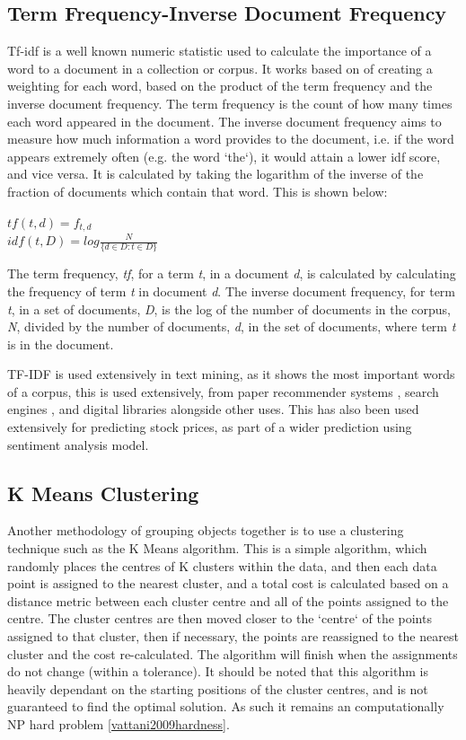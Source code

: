  \subsection{Term Frequency-Inverse Document Frequency}
 Tf-idf is a well known numeric statistic used to calculate the importance of a word to a document in a collection or corpus. It works based on of creating a weighting for each word, based on the product of the term frequency and the inverse document frequency. The term frequency is the count of how many times each word appeared in the document. The inverse document frequency aims to measure how much information a word provides to the document, i.e. if the word appears extremely often (e.g. the word `the`), it would attain a lower idf score, and vice versa. It is calculated by taking the logarithm of the inverse of the fraction of documents which contain that word. This is shown below:
 
 \begin{center}
 	$tf(t,d) = f_{t,d}$\\
 	$idf(t, D) = log\frac{N}{\{d \in D : t \in D\}}$
 \end{center}
 
The term frequency, \textit{tf}, for a term \textit{t}, in a document \textit{d}, is calculated by calculating the frequency of term \textit{t} in document \textit{d}. The inverse document frequency, for term \textit{t}, in a set of documents, \textit{D}, is the log of the number of documents in the corpus, \textit{N},  divided by the number of documents, \textit{d}, in the set of documents, where term \textit{t} is in the document.  
 
 TF-IDF is used extensively in text mining, as it shows the most important words of a corpus, this is used extensively, from paper recommender systems \cite{beel2016paper}, search engines \cite{xu2014pos}, and digital libraries \cite{philip2014application} alongside other uses. This has also been used extensively for predicting stock prices, as part of a wider prediction using sentiment analysis model. 
 
 
\subsection{K Means Clustering}
Another methodology of grouping objects together is to use a clustering technique such as the K Means algorithm. This is a simple algorithm, which randomly places the centres of K clusters within the data, and then each data point is assigned to the nearest cluster, and a total cost is calculated based on a distance metric between each cluster centre and all of the points assigned to the centre. The cluster centres are then moved closer to the `centre` of the points assigned to that cluster, then if necessary, the points are reassigned to the nearest cluster and the cost re-calculated. The algorithm will finish when the assignments do not change (within a tolerance). It should be noted that this algorithm is heavily dependant on the starting positions of the cluster centres, and is not guaranteed to find the optimal solution. As such it remains an computationally NP hard problem \ref{vattani2009hardness}. 
 
